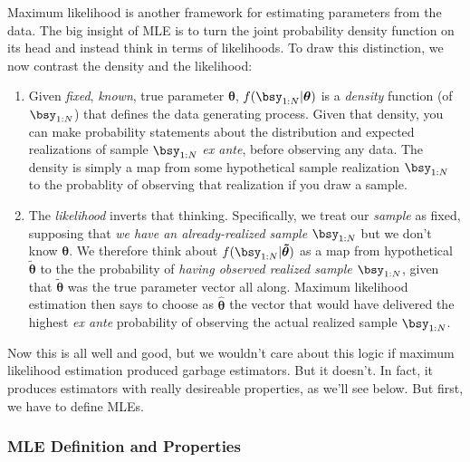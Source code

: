 \documentclass[12pt]{article}
\theoremstyle{plain}
\theoremstyle{definition}
\theoremstyle{remark}
\newcommand{\bstheta}{\boldsymbol{\theta}}
\newcommand{\bshattheta}{\boldsymbol{\hat{\theta}}}
\newcommand{\bstildetheta}{\boldsymbol{\tilde{\theta}}}
\begin{document}
Maximum likelihood is another framework for estimating parameters from
the data. The big insight of MLE is to turn the joint probability
density function on its head and instead think in terms of likelihoods.
To draw this distinction, we now contrast the density and the
likelihood:
\begin{enumerate}[label=(\roman*)]
  \item Given \emph{fixed}, \emph{known}, true parameter $\bstheta$,
    $f(\bsy_{1:N}|\bstheta)$ is a \emph{density} function (of
    $\bsy_{1:N}$) that defines the data generating process.  Given that
    density, you can make probability statements about the distribution
    and expected realizations of sample $\bsy_{1:N}$ \emph{ex ante},
    before observing any data. The density is simply a map from some
    hypothetical sample realization $\bsy_{1:N}$ to the probablity of
    observing that realization if you draw a sample.

  \item The \emph{likelihood} inverts that thinking. Specifically, we
    treat our \emph{sample} as fixed, supposing that
    \emph{we have an already-realized sample} $\bsy_{1:N}$ but we don't
    know $\bstheta$.  We therefore think about
    $f(\bsy_{1:N}|\bstildetheta)$ as a map from hypothetical
    $\bstildetheta$ to the the probability of
    \emph{having observed realized sample $\bsy_{1:N}$},
    given that $\bstildetheta$ was the true parameter vector all along.
    Maximum likelihood estimation then says to choose as $\bshattheta$
    the vector that would have delivered the highest \emph{ex ante}
    probability of observing the actual realized sample $\bsy_{1:N}$.
\end{enumerate}
Now this is all well and good, but we wouldn't care about this logic if
maximum likelihood estimation produced garbage estimators. But it
doesn't. In fact, it produces estimators with really desireable
properties, as we'll see below. But first, we have to define MLEs.

\subsubsection{MLE Definition and Properties}
\end{document}
